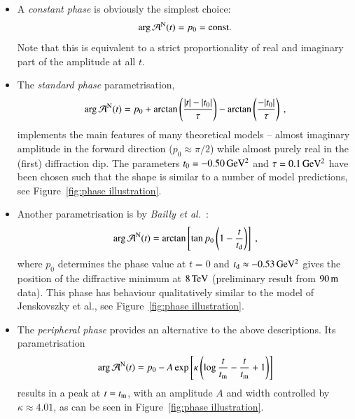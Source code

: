 \begin{itemize}
\item A {\it constant phase} is obviously the simplest choice:
\begin{equation}
\label{eq:nuc phase con}
\arg {\cal A}^{\rm N}(t) = p_0 = \hbox{const.}
\end{equation}
Note that this is equivalent to a strict proportionality of real and imaginary part of the amplitude at all $t$.

\item The {\it standard phase} parametrisation,
\begin{equation}
\label{eqn:nuc phase std}
\arg {\cal A}^{\rm N}(t) = p_{0} + \arctan \left(\frac{|t|-|t_{0}|}{\tau}\right) -  \arctan \left(\frac{-|t_{0}|}{\tau}\right) \: ,
\end{equation}
implements the main features of many theoretical models -- almost imaginary amplitude in the forward direction ($p_0 \approx \pi/2$) while almost purely real in the (first) diffraction dip. The parameters $t_0 = - 0.50\,{\rm GeV^2}$ and $\tau = 0.1\,{\rm GeV^2}$ have been chosen such that the shape is similar to a number of model predictions, see Figure~\ref{fig:phase illustration}.

\item Another parametrisation is by {\em Bailly et al.}~\cite{bailly87}:
\begin{equation}
\label{eq:nuc phase bai}
	\arg {\cal A}^{\rm N}(t) = \arctan \left[ \tan p_0 \left(1 - {t\over t_{\rm d}} \right) \right]\ ,
\end{equation}
where $p_0$ determines the phase value at $t=0$ and $t_{\rm d} \approx -0.53\,{\rm GeV^2}$ gives the position of the diffractive minimum at $8\,{\rm TeV}$ (preliminary result from $90\,{\rm m}$ data). This phase has behaviour qualitatively similar to the model of Jenskovszky et al., see Figure~\ref{fig:phase illustration}.

\item The {\it peripheral phase} \cite{kl94} provides an alternative to the above descriptions. Its parametrisation
\begin{equation}
\label{eq:nuc phase per}
\arg {\cal A}^{\rm N}(t) = p_0 - A \exp\left[ \kappa \left( \log {t\over t_{\rm m}} - {t\over t_{\rm m}} + 1 \right) \right]
\end{equation}
results in a peak at $t = t_{\rm m}$, with an amplitude $A$ and width controlled by $\kappa \approx 4.01$, as can be seen in Figure~\ref{fig:phase illustration}.
\end{itemize}

